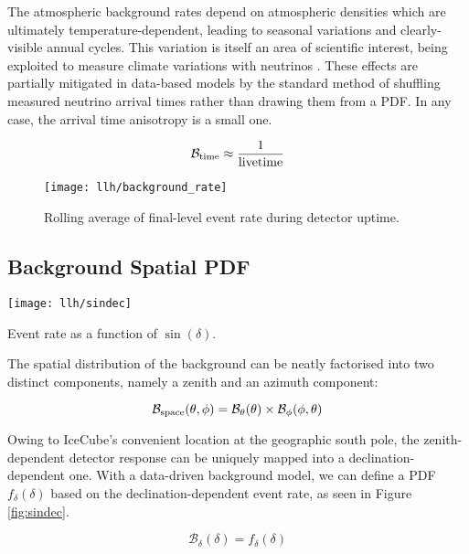 The atmospheric background rates depend on atmospheric densities which are ultimately temperature-dependent, leading to seasonal variations and clearly-visible annual cycles. This variation is itself an area of scientific interest, being exploited to measure climate variations with neutrinos . These effects are partially mitigated in data-based models by the standard method of shuffling measured neutrino arrival times rather than drawing them from a PDF. In any case, the arrival time anisotropy is a small one.

\begin{equation}
\mathcal{B}_{\textup{time}} \approx \frac{1}{\textup{livetime}}
\end{equation}

\begin{figure}[!ht]
	\centering \texttt{[image: llh/background\_rate]}
	\caption{Rolling average of final-level event rate during detector uptime.}
	\label{fig:background_rate}
\end{figure}

\subsection*{Background Spatial PDF}

\begin{marginfigure}
	\centering \texttt{[image: llh/sindec]}
	\caption{Event rate as a function of $\sin(\delta)$.}
	\label{fig:sindec}
\end{marginfigure}

The spatial distribution of the background can be neatly factorised into two distinct components, namely a zenith and an azimuth component:

\begin{equation}
	\mathcal{B}_{\textup{space}} (\theta, \phi) = \mathcal{B}_{\theta}(\theta) \times \mathcal{B}_{\phi}(\phi, \theta)
	\label{eq:b_space_local}
\end{equation}

Owing to IceCube's convenient location at the geographic south pole, the zenith-dependent detector response can be uniquely mapped into a declination-dependent one. With a data-driven background model, we can define a PDF $f_{\delta}(\delta)$ based on the declination-dependent event rate, as seen in Figure \ref{fig:sindec}.

\begin{equation}
	\mathcal{B}_{\delta}(\delta) = f_{\delta}(\delta)
	\label{eq:b_theta}
\end{equation}

